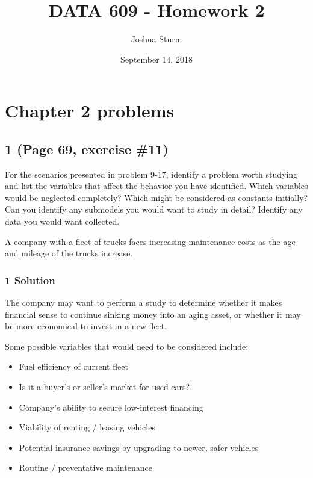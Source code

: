 \documentclass[]{article}
\title{DATA 609 - Homework 2}
\author{Joshua Sturm}
\date{September 14, 2018}
\begin{document}
\maketitle

\hypertarget{chapter-2-problems}{%
\section{Chapter 2 problems}\label{chapter-2-problems}}

\hypertarget{page-69-exercise-11}{%
\subsection{1 (Page 69, exercise \#11)}\label{page-69-exercise-11}}

For the scenarios presented in problem 9-17, identify a problem worth
studying and list the variables that affect the behavior you have
identified. Which variables would be neglected completely? Which might
be considered as constants initially? Can you identify any submodels you
would want to study in detail? Identify any data you would want
collected.

\indent A company with a fleet of trucks faces increasing maintenance
costs as the age and mileage of the trucks increase.

\hypertarget{solution}{%
\subsubsection{1 Solution}\label{solution}}

The company may want to perform a study to determine whether it makes
financial sense to continue sinking money into an aging asset, or
whether it may be more economical to invest in a new fleet.

Some possible variables that would need to be considered include:

\begin{itemize}
\item Fuel efficiency of current fleet
\item Is it a buyer's or seller's market for used cars?
\item Company's ability to secure low-interest financing
\item Viability of renting / leasing vehicles
\item Potential insurance savings by upgrading to newer, safer vehicles
\item Routine / preventative maintenance
\end{itemize}
\end{document}

